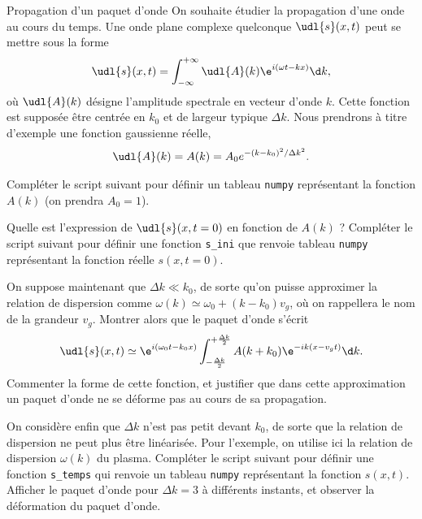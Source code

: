   
\begin{exo}[PC][3][python]{Propagation d'un paquet d'onde}
On souhaite étudier la propagation d'une onde au cours du temps. Une onde plane complexe quelconque $\udl{s}(x,t)$ peut se mettre sous la forme
$$
\udl{s}(x,t) =\int_{-\infty}^{+\infty}\udl{A}(k)\e^{i(\omega t-kx)}\d k,
$$
où $\udl{A}(k)$ désigne l'amplitude spectrale en vecteur d'onde $k$. Cette fonction est supposée être centrée en $k_0$ et de largeur typique $\Delta k$. Nous prendrons à titre d'exemple une fonction gaussienne réelle,
$$
\udl{A}(k) = A(k) = A_0 e^{-(k-k_0)^2/\Delta k^2}.
$$
\begin{quest}
  \item  Compléter le script suivant pour définir un tableau \texttt{numpy} représentant la fonction $A(k)$ (on prendra $A_0=1$).
  \item Quelle est l'expression de $\udl{s}(x,t=0)$ en fonction de $A(k)$ ?  Compléter le script suivant pour définir une fonction \texttt{s\_ini} que renvoie tableau \texttt{numpy} représentant la fonction réelle $s(x,t=0)$.
  \item On suppose maintenant que $\Delta k \ll k_0$, de sorte qu'on puisse approximer la relation de dispersion comme $\omega(k) \simeq \omega_0 + (k-k_0)v_g$, où on rappellera le nom de la grandeur $v_g$. Montrer alors que le paquet d'onde s'écrit
  $$
  \udl{s}(x,t)
   \simeq \e^{i(\omega_0 t-k_0 x)}\int_{-\frac{\Delta k}{2}}^{+\frac{\Delta k}{2}}A(k + k_0)\e^{-i k (x-v_g t )}\d k.
  $$
  Commenter la forme de cette fonction, et justifier que dans cette approximation un paquet d'onde ne se déforme pas au cours de sa propagation.
  \item On considère enfin que $\Delta k$ n'est pas petit devant $k_0$, de sorte que la relation de dispersion ne peut plus être linéarisée. Pour l'exemple, on utilise ici la relation de dispersion $\omega(k)$ du plasma. Compléter le script suivant pour définir une fonction \texttt{s\_temps} qui renvoie un tableau \texttt{numpy} représentant la fonction $s(x,t)$. Afficher le paquet d'onde pour $\Delta k = 3$ à différents instants, et observer la déformation du paquet d'onde.
  \sol{
  }
\end{quest}
\end{exo}


